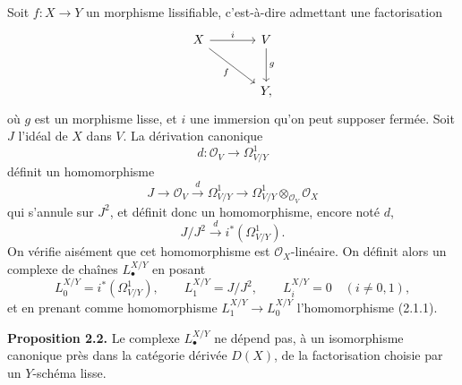 \documentclass[11pt]{article}
\begin{document}
Soit $f:X\to Y$ un morphisme lissifiable, c'est-à-dire admettant une factorisation
\[
\begin{tikzcd}[column sep=large,row sep=large]
X \arrow[r,"i"] \arrow[dr,"f"'] & V \arrow[d,"g"]\\
& Y,
\end{tikzcd}
\]
où $g$ est un morphisme lisse, et $i$ une immersion qu'on peut supposer fermée. Soit $J$ l'idéal de $X$ dans $V$. La dérivation canonique
\[
d:\mathcal O_V\longrightarrow\Omega^1_{V/Y}
\]
définit un homomorphisme
\[
J\longrightarrow\mathcal O_V\xrightarrow{d}\Omega^1_{V/Y}\longrightarrow
\Omega^1_{V/Y}\otimes_{\mathcal O_V}\mathcal O_X
\]
qui s'annule sur $J^2$, et définit donc un homomorphisme, encore noté $d$,
\begin{equation}\tag{2.1.1}
J/J^2\xrightarrow{d} i^*(\Omega^1_{V/Y}).
\end{equation}
On vérifie aisément que cet homomorphisme est $\mathcal O_X$-linéaire. On définit alors un complexe de chaînes $L^{X/Y}_\bullet$ en posant
\[
L^{X/Y}_0=i^*(\Omega^1_{V/Y}),\qquad
L^{X/Y}_1=J/J^2,
\qquad
L^{X/Y}_i=0\quad(i\neq0,1),
\]
et en prenant comme homomorphisme $L^{X/Y}_1\to L^{X/Y}_0$ l'homomorphisme (2.1.1).

\textbf{Proposition 2.2.} Le complexe $L^{X/Y}_\bullet$ ne dépend pas, à un isomorphisme canonique près dans la catégorie dérivée $D(X)$, de la factorisation choisie par un $Y$-schéma lisse.
\end{document}
